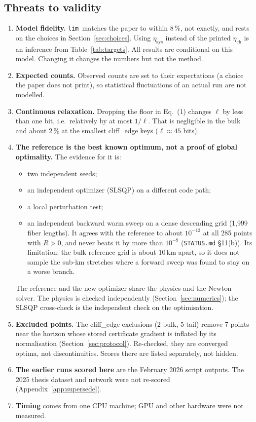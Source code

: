 \documentclass[11pt,a4paper]{article}
\newcommand{\plim}{\texttt{lim}}
\begin{document}
\subsection{Threats to validity}
\begin{enumerate}
\item \textbf{Model fidelity.} \plim\ matches the paper to within 8\,\%, not exactly, and rests on the choices in
  Section~\ref{sec:choices}. Using $\eta_{\mathrm{sys}}$ instead of the printed $\eta_{\mathrm{ch}}$ is an
  inference from Table~\ref{tab:targets}. All results are conditional on this model. Changing it changes the
  numbers but not the method.
\item \textbf{Expected counts.} Observed counts are set to their expectations (a choice the paper does not
  print), so statistical fluctuations of an actual run are not modelled.
\item \textbf{Continuous relaxation.} Dropping the floor in Eq.~(1) changes $\ell$ by less than one bit, i.e.\
  relatively by at most $1/\ell$. That is negligible in the bulk and about 2\,\% at the smallest cliff\_edge keys
  ($\ell\approx45$ bits).
\item \textbf{The reference is the best known optimum, not a proof of global optimality.} The evidence for it is:
  \begin{itemize}
  \item two independent seeds;
  \item an independent optimizer (SLSQP) on a different code path;
  \item a local perturbation test;
  \item an independent backward warm sweep on a dense descending grid (1{,}999 fiber lengths). It agrees with the
    reference to about $10^{-12}$ at all 285 points with $R>0$, and never beats it by more than $10^{-9}$
    (\texttt{STATUS.md} \S11(b)). Its limitation: the bulk reference grid is about 10\,km apart, so it does not sample
    the sub-km stretches where a forward sweep was found to stay on a worse branch.
  \end{itemize}
  The reference and the new optimizer share the physics and the Newton solver. The physics is checked
  independently (Section~\ref{sec:numerics}); the SLSQP cross-check is the independent check on the optimisation.
\item \textbf{Excluded points.} The cliff\_edge exclusions (2 bulk, 5 tail) remove 7 points near the horizon whose
  stored certificate gradient is inflated by its normalisation (Section~\ref{sec:protocol}). Re-checked, they are
  converged optima, not discontinuities. Scores there are listed separately, not hidden.
\item \textbf{The earlier runs scored here} are the February 2026 script outputs. The 2025 thesis dataset and
  network were not re-scored (Appendix~\ref{app:supersede}).
\item \textbf{Timing} comes from one CPU machine; GPU and other hardware were not measured.
\end{enumerate}
\end{document}
